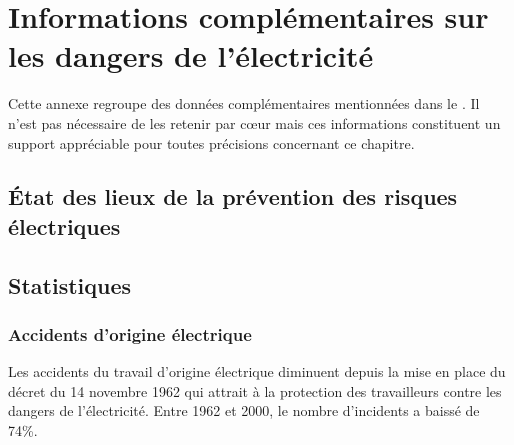 \chapter{Informations complémentaires sur les dangers de l'électricité}

Cette annexe regroupe des données complémentaires mentionnées dans le . Il n'est pas nécessaire de les retenir par c\oe{}ur mais ces informations constituent un support appréciable pour toutes précisions concernant ce chapitre.

\section{\'Etat des lieux de la prévention des risques électriques\label{sec:etat_lieux_prevention_electrique}}

\section{Statistiques}

\subsection{Accidents d'origine électrique}

Les accidents du travail d'origine électrique diminuent depuis la mise en place du décret du 14 novembre 1962 qui attrait à la protection des travailleurs contre les dangers de l'électricité. Entre 1962 et 2000, le nombre d'incidents a baissé de 74\%. 

